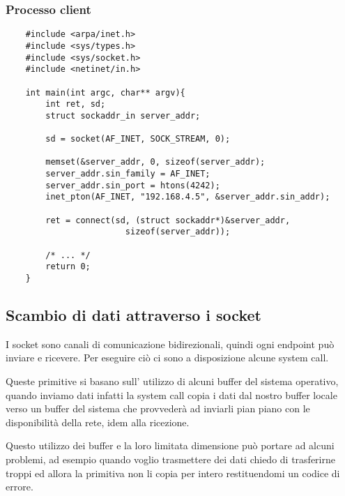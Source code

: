 \subsubsection{Processo client}
\begin{verbatim}
    #include <arpa/inet.h>
    #include <sys/types.h>
    #include <sys/socket.h>
    #include <netinet/in.h>
    
    int main(int argc, char** argv){
        int ret, sd;
        struct sockaddr_in server_addr;
        
        sd = socket(AF_INET, SOCK_STREAM, 0);
        
        memset(&server_addr, 0, sizeof(server_addr);
        server_addr.sin_family = AF_INET;
        server_addr.sin_port = htons(4242);
        inet_pton(AF_INET, "192.168.4.5", &server_addr.sin_addr);
        
        ret = connect(sd, (struct sockaddr*)&server_addr,
                        sizeof(server_addr));
        
        /* ... */
        return 0;
    }
\end{verbatim}

\subsection{Scambio di dati attraverso i socket}
I socket sono canali di comunicazione bidirezionali, quindi ogni endpoint può inviare e ricevere.
Per eseguire ciò ci sono a disposizione alcune system call.

Queste primitive si basano sull' utilizzo di alcuni buffer del sistema operativo, quando inviamo dati infatti la system call copia i dati dal nostro buffer locale verso un buffer del sistema che provvederà ad inviarli pian piano con le disponibilità della rete, idem alla ricezione.

Questo utilizzo dei buffer e la loro limitata dimensione può portare ad alcuni problemi, ad esempio quando voglio trasmettere dei dati chiedo di trasferirne troppi ed allora la primitiva non li copia per intero restituendomi un codice di errore.

